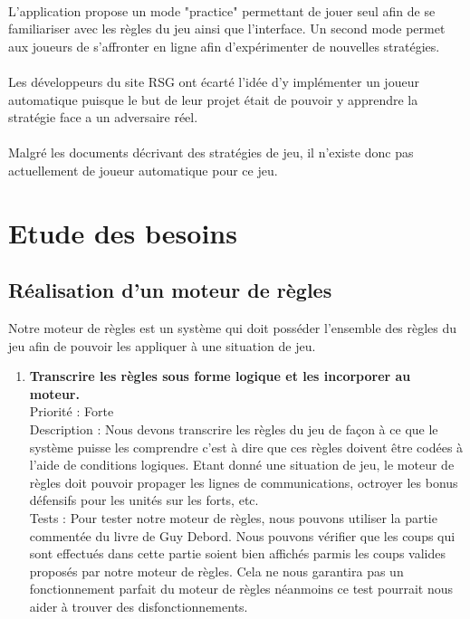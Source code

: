 \documentclass[12pt]{article}
\begin{document}
		\paragraph{}
		L'application propose un mode "practice" permettant de jouer seul afin de se familiariser avec les règles du jeu ainsi que l'interface.
		Un second mode permet aux joueurs de s'affronter en ligne afin d'expérimenter de nouvelles stratégies.
		
		\paragraph{}
		Les développeurs du site RSG ont écarté l'idée d'y implémenter un joueur automatique puisque le but de leur projet était de 
		pouvoir y apprendre la stratégie face a un adversaire réel.
		
		\paragraph{}
		Malgré les documents décrivant des stratégies de jeu, il n'existe donc pas actuellement de joueur automatique pour ce jeu.
		
		\clearpage

	\section{Etude des besoins}    

		\subsection{Réalisation d'un moteur de règles}

			Notre moteur de règles est un système qui doit posséder l'ensemble des règles du jeu afin de pouvoir les appliquer à une situation de jeu.

			\begin{enumerate}

				\item \textbf{Transcrire les règles sous forme logique et les incorporer au moteur.} 
				\\[0.7\baselineskip]
				Priorité : Forte 
				\\[0.7\baselineskip]
				Description : Nous devons transcrire les règles du jeu de façon à ce que le système puisse les comprendre c'est à dire que ces 
				règles doivent être codées à l'aide de conditions logiques. Etant donné une situation de jeu, le moteur de règles doit pouvoir 
				propager les lignes de communications, octroyer les bonus défensifs pour les unités sur les forts, etc.
				\\[0.7\baselineskip]
				Tests : Pour tester notre moteur de règles, nous pouvons utiliser la partie commentée du livre de Guy Debord. Nous pouvons 
				vérifier que les coups qui sont effectués dans cette partie soient bien affichés parmis les coups valides proposés par notre 
				moteur de règles. Cela ne nous garantira pas un fonctionnement parfait du moteur de règles néanmoins ce test pourrait nous 
				aider à trouver des disfonctionnements. 
				\\[0.7\baselineskip]
				
			\end{enumerate}
\end{document}
